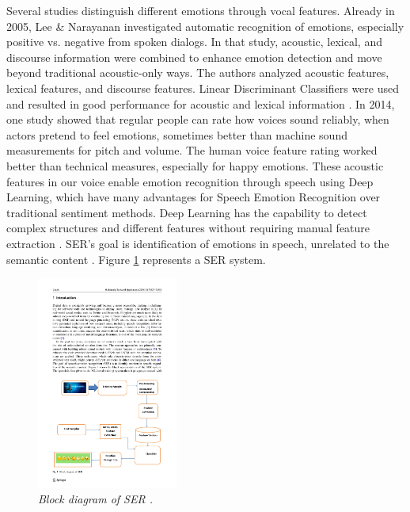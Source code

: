 Several studies distinguish different emotions through vocal features. Already in 2005, Lee \& Narayanan investigated automatic recognition of emotions, especially positive vs. negative from spoken dialogs. In that study, acoustic, lexical, and discourse information were combined to enhance emotion detection and move beyond traditional acoustic-only ways. The authors analyzed acoustic features, lexical features, and discourse features. Linear Discriminant Classifiers were used and resulted in good performance for acoustic and lexical information \autocite{ChulMinLee2005}. In 2014, one study \autocite{Bnziger2014} showed that regular people can rate how voices sound reliably, when actors pretend to feel emotions, sometimes better than machine sound measurements for pitch and volume. The human voice feature rating worked better than technical measures, especially for happy emotions. 
These acoustic features in our voice enable emotion recognition through speech using Deep Learning, which have many advantages for Speech Emotion Recognition over traditional sentiment methods. Deep Learning has the capability to detect complex structures and different features without requiring manual feature extraction \autocite{Khalil2019}. SER’s goal is identification of emotions in speech, unrelated to the semantic content \autocite{Kusal2024}. Figure \ref{fig:blockdiagram-SER} represents a SER system. 

\begin{figure}[ht]
    \centering
    \includegraphics[height=7cm]{png/background/block-diagram.pdf}
    \caption{\textit{Block diagram of SER \autocite{Tyagi2024}.}}
    \label{fig:blockdiagram-SER}
\end{figure}

